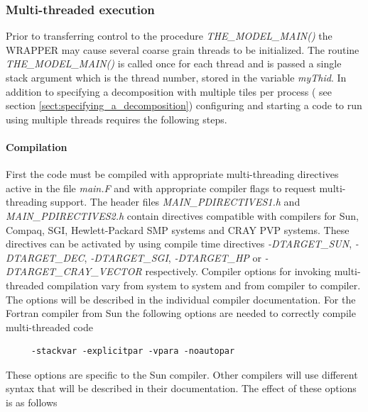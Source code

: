 \subsubsection{Multi-threaded execution}
\label{sect:multi-threaded-execution}
Prior to transferring control to the procedure {\em THE\_MODEL\_MAIN()} the
WRAPPER may cause several coarse grain threads to be initialized. The routine
{\em THE\_MODEL\_MAIN()} is called once for each thread and is passed a single
stack argument which is the thread number, stored in the
variable {\em myThid}. In addition to specifying a decomposition with
multiple tiles per process ( see section \ref{sect:specifying_a_decomposition}) 
configuring and starting a code to run using multiple threads requires the following
steps.\\

\paragraph{Compilation}
First the code must be compiled with appropriate multi-threading directives 
active in the file {\em main.F} and with appropriate compiler flags
to request multi-threading support. The header files 
{\em MAIN\_PDIRECTIVES1.h} and {\em MAIN\_PDIRECTIVES2.h}
contain directives compatible with compilers for Sun, Compaq, SGI,
Hewlett-Packard SMP systems and CRAY PVP systems. These directives can be 
activated by using compile time
directives {\em -DTARGET\_SUN}, 
{\em -DTARGET\_DEC}, {\em -DTARGET\_SGI}, {\em -DTARGET\_HP}
or {\em -DTARGET\_CRAY\_VECTOR} respectively. Compiler options
for invoking multi-threaded compilation vary from system to system
and from compiler to compiler. The options will be described
in the individual compiler documentation. For the Fortran compiler 
from Sun the following options are needed to correctly compile
multi-threaded code
\begin{verbatim}
     -stackvar -explicitpar -vpara -noautopar
\end{verbatim}
These options are specific to the Sun compiler. Other compilers
will use different syntax that will be described in their
documentation. The effect of these options is as follows

